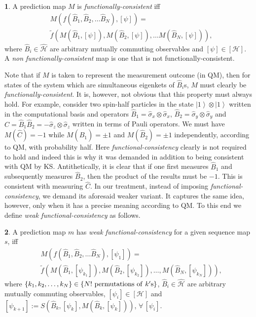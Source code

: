 \documentclass[doublecol,british]{epl2}
\theoremstyle{plain}
\theoremstyle{plain}
\theoremstyle{definition}
\newtheorem{defn}{\protect\definitionname}
\theoremstyle{remark}
\theoremstyle{remark}
\theoremstyle{remark}
\theoremstyle{plain}
\theoremstyle{plain}
\theoremstyle{plain}
\theoremstyle{definition}
\theoremstyle{definition}
\providecommand{\definitionname}{Definition}
\begin{document}
\begin{defn}
A prediction map $M$ is \emph{functionally-consistent} iff
\begin{align*} &
M(f(\hat{B}_{1},\hat{B}_{2},\dots\hat{B}_{N}),[\psi])
= \\ & \tilde
f(M(\hat{B}_{1},[\psi]),M(\hat{B}_{2},[\psi]),\dots
M(\hat{B}_{N},[\psi])), \end{align*}
where $\hat{B}_{i}\in\hat{\mathcal{H}}$ are
arbitrary mutually commuting observables and
$[\psi]\in[\mathcal{H}]$. A
\emph{non functionally-consistent} map is one that is not
functionally-consistent.  
\end{defn} 
Note that if $M$ is taken to represent the
measurement outcome (in QM), then for states of
the system which are simultaneous eigenkets of
$\hat{B}_{i}$s, $M$ must clearly be
\emph{functionally-consistent}. It is, however, not obvious that
this property must always hold. For example,
consider two spin-half particles in the state 
$\left|1\right\rangle \otimes\left|1\right\rangle
$ written in the computational basis and 
operators 
$\hat{B}_{1}=\hat{\sigma}_{x}\otimes\hat{\sigma}_{x}$,
$\hat{B}_{2}=\hat{\sigma}_{y}\otimes\hat{\sigma}_{y}$
and
$\hat{C}=\hat{B}_{1}\hat{B}_{2}=-\hat{\sigma}_{z}\otimes\hat{\sigma}_{z}$
written in terms of Pauli operators.
We must have $M(\hat{C})=-1$ while
$M(\hat{B}_{1})=\pm1$ and $M(\hat{B}_{2})=\pm1$
independently, according to QM, with probability
half. Here \emph{functional-consistency} clearly is not
required to hold { and indeed this is why it was demanded in addition to being consistent with QM by KS}.
Antithetically, it is clear that if one first
measures $\hat{B}_{1}$ and subsequently measures
$\hat{B}_{2}$, then the product of the results
must be $-1$. This is consistent with measuring
$\hat{C}$. { In our treatment, instead of imposing \emph{functional-consistency}, we demand its aforesaid weaker variant. It captures the same idea, however, only when it has a precise meaning according to QM.} { To this end we define}
\emph{weak functional-consistency} as follows.
\begin{defn} 
A prediction map $m$ has
\emph{weak functional-consistency} for a given
sequence map $s$, iff \begin{align*}
&M(f(\hat{B}_{1},\hat{B}_{2},\dots\hat{B}_{N}),[\psi_{1}])=\\
&\tilde
f(M(\hat{B}_{1},[\psi_{k_{1}}]),M(\hat{B}_{2},[\psi_{k_{2}}]),\dots,M(\hat{B}_{N},[\psi_{k_{N}}])),
\end{align*} 
where
$\{k_{1},k_{2},\dots,k_{N}\} \in\{
N! {\rm ~permutations~of~}  k'{\rm s} \}$, 
$\hat{B}_{i}\in\hat{\mathcal{H}}$ are
arbitrary mutually commuting observables,
$[\psi_{i}]\in[\mathcal{H}]$ and
$[\psi_{k+1}] :=
S(\hat{B}_{k},[\psi_{k}],M(\hat{B}_{k},[\psi_{k}]))$,
$\forall\,[\psi_{i}]$.  
\label{defn:seqnMltpl}
\end{defn} 
\end{document}
